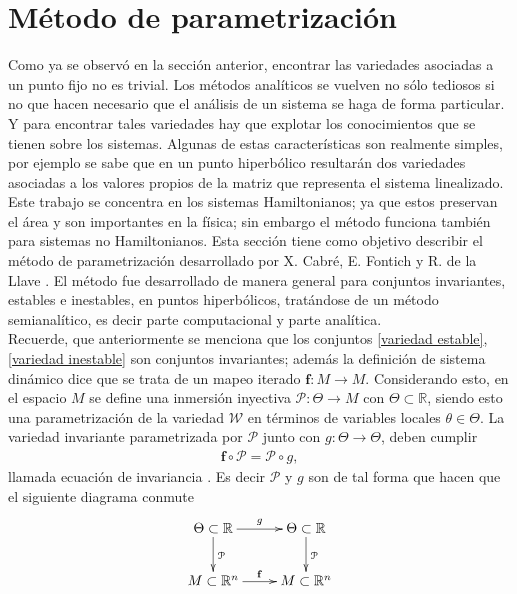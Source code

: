 \section{Método de parametrización}
Como ya se observó en la sección anterior, encontrar las variedades asociadas a un punto fijo no es trivial. Los métodos analíticos se vuelven no sólo tediosos si no que hacen necesario que el análisis de un sistema se haga de forma particular. Y para encontrar tales variedades hay que explotar los conocimientos que se tienen sobre los sistemas. Algunas de estas características son realmente simples, por ejemplo se sabe que en un punto hiperbólico resultarán dos variedades asociadas a los valores propios de la matriz que representa el sistema linealizado. Este trabajo se concentra en los sistemas Hamiltonianos; ya que estos preservan el área y son importantes en la física; sin embargo el método funciona también para sistemas no Hamiltonianos. Esta sección tiene como objetivo describir el método de parametrización desarrollado por X. Cabré, E. Fontich y R. de la Llave \cite{Haro}. El método fue desarrollado de manera general para conjuntos invariantes, estables e inestables, en puntos hiperbólicos, tratándose de un método semianalítico, es decir parte computacional y parte analítica.\\



Recuerde, que anteriormente se menciona que los conjuntos \eqref{variedad estable}, \eqref{variedad inestable} son conjuntos invariantes; además la definición de sistema dinámico dice que se trata de un mapeo iterado $\mathbf{f}:M \rightarrow M$. Considerando esto, en el espacio $M$ se define una inmersión inyectiva $\mathcal{P}:\Theta \rightarrow M$ con $\Theta\subset \mathbb{R}$, siendo esto una parametrización de la variedad $\mathcal{W}$ en términos de variables locales $\theta \in \Theta$. La variedad invariante parametrizada por $\mathcal{P}$ junto con $g:\Theta \rightarrow \Theta$, deben cumplir 
\begin{eqnarray}
\mathbf{f} \circ \mathcal{P} =\mathcal{P}  \circ g,  \label{Ecua de invariancia}
\end{eqnarray}
llamada ecuación de invariancia \cite{Haro}.
Es decir $\mathcal{P}$ y $g$ son de tal forma que hacen que el siguiente diagrama conmute
\begin{eqnarray}
\xymatrix{
\Theta\subset\mathbb{R} \ar[d]^{\mathcal{P}} \ar[r]^{g} & \Theta\subset\mathbb{R} \ar[d]^{\mathcal{P}} \\
M\subset\mathbb{R}^{n} \ar[r]^{\mathbf{f}} & M\subset\mathbb{R}^{n}
}\label{conmutativo}
\end{eqnarray}

